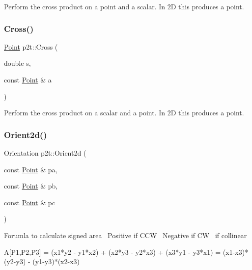 Perform the cross product on a point and a scalar. In 2D this produces a point. \mbox{\label{namespacep2t_ae4e351c78d87c5a772f1dd6be7540803}} 
\subsubsection{\texorpdfstring{Cross()}{Cross()}\hspace{0.1cm}{\footnotesize\ttfamily [2/2]}}
{\footnotesize\ttfamily \hyperlink{structp2t_1_1Point}{Point} p2t\+::\+Cross (\begin{DoxyParamCaption}\item[{double}]{s,  }\item[{const \hyperlink{structp2t_1_1Point}{Point} \&}]{a }\end{DoxyParamCaption})\hspace{0.3cm}{\ttfamily [inline]}}

Perform the cross product on a scalar and a point. In 2D this produces a point. \mbox{\label{namespacep2t_a9fa090c7f13c6b2665d3bdcd48b3478b}} 
\subsubsection{\texorpdfstring{Orient2d()}{Orient2d()}}
{\footnotesize\ttfamily Orientation p2t\+::\+Orient2d (\begin{DoxyParamCaption}\item[{const \hyperlink{structp2t_1_1Point}{Point} \&}]{pa,  }\item[{const \hyperlink{structp2t_1_1Point}{Point} \&}]{pb,  }\item[{const \hyperlink{structp2t_1_1Point}{Point} \&}]{pc }\end{DoxyParamCaption})}

Forumla to calculate signed area~\newline
 Positive if C\+CW~\newline
 Negative if CW~ if collinear~\newline
 
\begin{DoxyPre}
A[P1,P2,P3]  =  (x1*y2 - y1*x2) + (x2*y3 - y2*x3) + (x3*y1 - y3*x1)
             =  (x1-x3)*(y2-y3) - (y1-y3)*(x2-x3)
\end{DoxyPre}
 